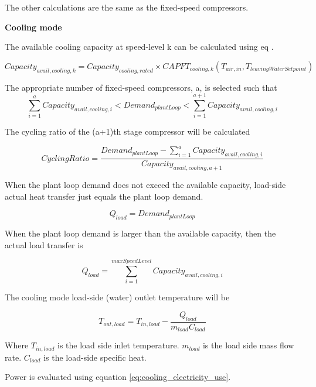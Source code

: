 The other calculations are the same as the fixed-speed compressors.

\noindent\textbf{Cooling mode}

The available cooling capacity at speed-level k can be calculated using eq .

\begin{equation}
Capacity_{avail,cooling,k} = Capacity_{cooling,rated} \times CAPFT_{cooling,k}(T_{air,in},T_{leavingWaterSetpoint})
\end{equation}

The appropriate number of fixed-speed compressors, a, is selected such that
\begin{equation}
\sum_{i=1}^{a} Capacity_{avail,cooling,i} < Demand_{plantLoop} < \sum_{i=1}^{a+1} Capacity_{avail,cooling,i}
\end{equation}

The cycling ratio of the (a+1)th stage compressor will be calculated

\begin{equation}
CyclingRatio = \frac{Demand_{plantLoop} - \sum_{i=1}^{a} Capacity_{avail,cooling,i}}{Capacity_{avail,cooling,a+1}}
\end{equation}

When the plant loop demand does not exceed the available capacity, load-side
actual heat transfer just equals the plant loop demand.

\begin{equation}
Q_{load} = Demand_{plantLoop}
\end{equation}

When the plant loop demand is larger than the available capacity, then the actual load transfer is

\begin{equation}
Q_{load} = \sum_{i=1}^{maxSpeedLevel} Capacity_{avail,cooling,i}
\end{equation}

The cooling mode load-side (water) outlet temperature will be

\begin{equation}
T_{out,load} = T_{in,load} - \frac{Q_{load}}{m_{load}C_{load}}
\end{equation}

Where $T_{in,load}$ is the load side inlet temperature. $m_{load}$ is the load side mass
flow rate. $C_{load}$ is the load-side specific heat.

Power is evaluated using equation \ref{eq:cooling_electricity_use}.

